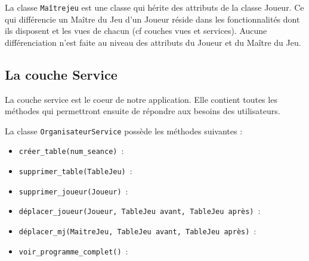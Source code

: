 \documentclass[11pt]{article}
\begin{document}
\bigbreak

La classe \texttt{Maîtrejeu} est une classe qui hérite des attributs de la classe Joueur. Ce qui différencie un Maître du Jeu d'un Joueur réside dans les fonctionnalités dont ils disposent et les vues de chacun (cf couches vues et services). Aucune différenciation n'est faite au niveau des attributs du Joueur et du Maître du Jeu.







\subsection{La couche Service}

La couche service est le coeur de notre application. Elle contient toutes les méthodes qui permettront ensuite de répondre aux besoins des utilisateurs.




\bigbreak


La classe \texttt{OrganisateurService} possède les méthodes suivantes :
\begin{itemize}[label=, font=\small]
    \item \texttt{créer\_table(num\_seance)}~: 
    \item \texttt{supprimer\_table(TableJeu)}~: 
    \item \texttt{supprimer\_joueur(Joueur)}~: 
    \item \texttt{déplacer\_joueur(Joueur, TableJeu avant, TableJeu après)}~: 
    \item \texttt{déplacer\_mj(MaitreJeu, TableJeu avant, TableJeu après)}~: 
    \item \texttt{voir\_programme\_complet()}~: 
\end{itemize}

\bigbreak
\end{document}
